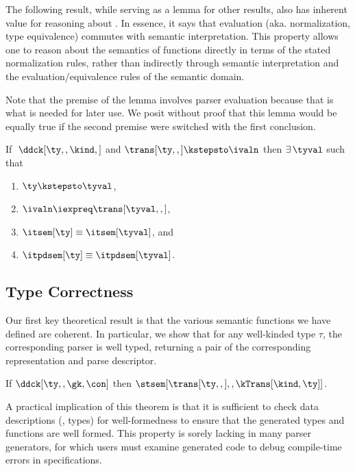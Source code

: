 The following result, while serving as a lemma for other results, also has inherent value for reasoning about \ddc{}. In essence, it says that evaluation (aka. normalization,
type equivalence) commutes with semantic interpretation.
This property  allows one to
reason about the semantics of \ddc{} functions directly in terms of
the stated normalization rules, rather than indirectly through
semantic interpretation and the evaluation/equivalence rules of the
semantic domain. 

Note that the premise of the lemma involves parser
evaluation because that is what is needed for later use. We posit without
proof that this lemma would be equally true if the second
premise were switched with the first conclusion.


\begin{lemma}
  If $\; \ddck[\ty,,\kind,]$ and $\trans[\ty,,] \kstepsto \ivaln$ then
  $\exists\, \tyval$ such that
  \begin{enumerate}
  \item $\ty \kstepsto \tyval$,
  \item $\ivaln \iexpreq \trans[\tyval,,]$,
  \item $\itsem[\ty] \equiv \itsem[\tyval]$, and
  \item $\itpdsem[\ty] \equiv \itpdsem[\tyval]$.
  \end{enumerate}
\end{lemma}

\subsection{Type Correctness}
Our first key theoretical result is that the various semantic
functions we have defined are coherent.  In particular, we show that
for any well-kinded \ddca{} type $\tau$, the corresponding parser is
well typed, returning a pair of the corresponding representation and
parse descriptor.


\begin{theorem}
\label{thm:s-type-correctness}
  If $\ddck[\ty,,\gk,\con]$ then
  $\stsem[{\trans[\ty,,]},,\kTrans[\kind,\ty]]$.
\end{theorem}

A practical implication of this theorem is that it is sufficient to check data descriptions (\ie{}, \ddca{} types) for well-formedness to ensure that the generated types and functions are well formed. This property is sorely lacking in many parser generators, for which users must examine generated code to debug compile-time errors in specifications.

